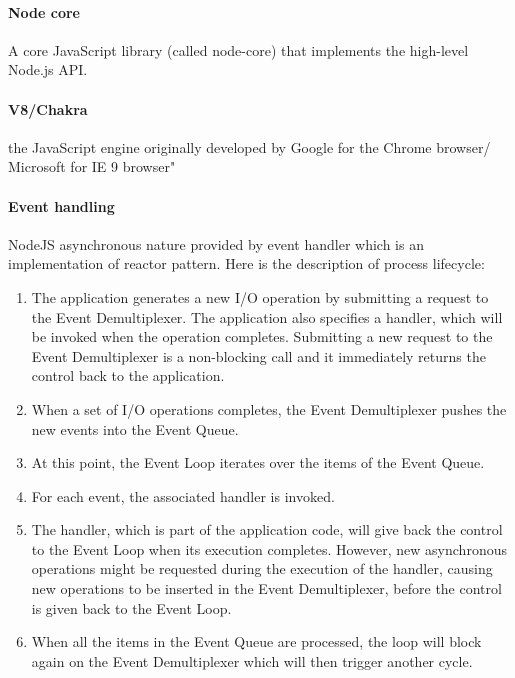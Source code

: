 \paragraph{Node core}
A core JavaScript library (called node-core) that implements the high-level Node.js API.

\paragraph{V8/Chakra} the JavaScript engine originally developed by Google for the Chrome browser/ Microsoft for IE 9 browser"\cite{nodejsbook} 

\paragraph{Event handling}
NodeJS asynchronous nature provided by event handler which is an implementation of reactor pattern. Here is the description of process lifecycle\cite{nodejsbook}:
\begin{enumerate}
\item The application generates a new I/O operation by submitting a request to the Event Demultiplexer. The application also specifies a handler, which will be invoked when the operation completes. Submitting a new request to the Event Demultiplexer is a non-blocking call and it immediately returns the control back to the application.
\item When a set of I/O operations completes, the Event Demultiplexer pushes the new events into the Event Queue.
\item At this point, the Event Loop iterates over the items of the Event Queue.
\item For each event, the associated handler is invoked.
\item The handler, which is part of the application code, will give back the control to the Event Loop when its execution completes. However, new asynchronous operations might be requested during the execution of the handler, causing new operations to be inserted in the Event Demultiplexer, before the control is given back to the Event Loop.
\item When all the items in the Event Queue are processed, the loop will block again on the Event Demultiplexer which will then trigger another cycle.
\end{enumerate}

